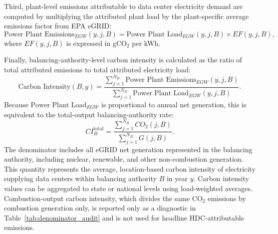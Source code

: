 \documentclass[12pt]{article}
\begin{document}
Third, plant-level emissions attributable to data center electricity demand are computed 
by multiplying the attributed plant load by the plant-specific average emissions factor 
from EPA eGRID:
\[
\text{Power Plant Emissions}_{EGW}(y,j,B) =
\text{Power Plant Load}_{EGW}(y,j,B) \times EF(y,j,B),
\]
where $EF(y,j,B)$ is expressed in gCO$_2$ per kWh.

Finally, balancing-authority-level carbon intensity is calculated as the ratio of total 
attributed emissions to total attributed electricity load:
\[
\text{Carbon Intensity}(B,y) =
\frac{\sum_{j=1}^{N_B} \text{Power Plant Emissions}_{EGW}(y,j,B)}
{\sum_{j=1}^{N_B} \text{Power Plant Load}_{EGW}(y,j,B)} .
\]
Because $\text{Power Plant Load}_{EGW}$ is proportional to annual net generation, this is equivalent to the total-output balancing-authority rate:
\[
CI^{\mathrm{total}}_B =
\frac{\sum_{j=1}^{N_B} CO_{2}(j,B)}{\sum_{j=1}^{N_B} G(j,B)} .
\]
The denominator includes all eGRID net generation represented in the balancing authority, including nuclear, renewable, and other non-combustion generation. This quantity represents the average, location-based carbon intensity of electricity supplying data centers within balancing authority $B$ in year $y$. Carbon intensity values can be aggregated to state or national levels using load-weighted averages. Combustion-output carbon intensity, which divides the same CO$_2$ emissions by combustion generation only, is reported only as a diagnostic in Table~\ref{tab:denominator_audit} and is not used for headline HDC-attributable emissions.






\end{document}
